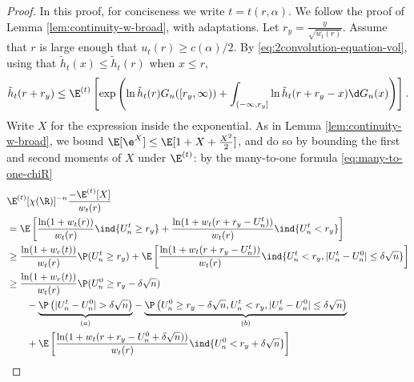 \documentclass[10pt,a4paper]{article}
\begin{document}


\begin{proof}
In this proof, for conciseness we write $t = t(r,\alpha)$. We follow the proof of Lemma \ref{lem:continuity-w-broad}, with adaptations. 
Let $r_y = \frac{y}{\sqrt{w_t(r)}}$. 
Assume that $r$ is large enough that $u_t(r) \geq c(\alpha)/2$.
By \eqref{eq:2convolution-equation-vol}, using that $\tilde h_t(x) \leq \tilde h_t(r)$ when $x\leq r$, 
\[ \tilde h_t(r+r_y) \leq \E^{(t)}\left[ \exp\left( \ln \tilde h_t(r) G_n([r_y,\infty)) + \int_{(-\infty,r_y]} \ln\tilde h_t(r+r_y-x) \d G_n(x) \right) \right] . \]
Write $X$ for the expression inside the exponential. As in Lemma \ref{lem:continuity-w-broad}, we bound $\E[\e^{X}] \leq \E[1 + X + \frac{X^2}{2}]$, and do so by bounding the first and second moments of $X$ under $\E^{(t)}$: by the many-to-one formula \eqref{eq:many-to-one-chiR}
\begin{align}
\nonumber & \E^{(t)}[\chi(\R)]^{-n} \frac{-\E^{(t)}[X]}{w_t(r)} \\
\nonumber &= \E\left[ \frac{\ln(1+w_t(r))}{w_t(r)} \ind{U_n^t \geq r_y} + \frac{\ln(1+w_t(r+r_y-U_n^t))}{w_t(r)}\ind{U_n^t < r_y} \right] \\
\nonumber &\geq \frac{\ln(1+w_r(t))}{w_t(r)}\P(U_n^t \geq r_y) + \E\left[ \frac{\ln(1+w_t(r+r_y-U_n^t))}{w_t(r)} \ind{U_n^t<r_y , |U_n^t-U_n^0|\leq \delta\sqrt{n}} \right]\\
\nonumber &\geq \frac{\ln(1+w_r(t))}{w_t(r)}\P(U_n^0 \geq r_y-\delta\sqrt{n}) \\
\nonumber &\qquad - \underset{(a)}{\underbrace{\P\left(|U_n^t - U_n^0|>\delta\sqrt{n}\right)}} - \underset{(b)}{\underbrace{\P\left( U_n^0 \geq r_y-\delta\sqrt{n}, U_n^t < r_y, |U_n^t-U_n^0|\leq \delta\sqrt{n} \right)}} \\
\nonumber &\qquad + \E\left[ \frac{\ln(1+w_t(r+r_y-U_n^0 + \delta\sqrt{n}))}{w_t(r)} \ind{U_n^0 < r_y+\delta\sqrt{n}} \right] \\

\end{align}
\end{proof}
\end{document}

